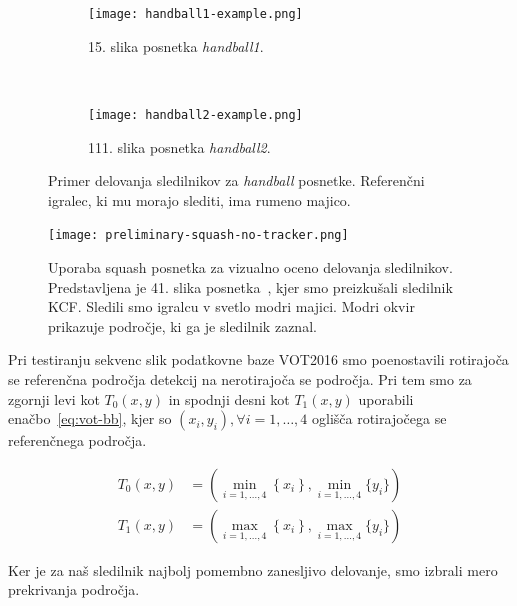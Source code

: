 \begin{figure}[!htbp]
	\centering
	
	\begin{subfigure}[t]{0.45\columnwidth}
		\texttt{[image: handball1-example.png]}
		\caption{15. slika posnetka \textit{handball1}.}
		\label{fig:testiranje-handball1}
	\end{subfigure}
	~
	\begin{subfigure}[t]{0.45\columnwidth}
		\texttt{[image: handball2-example.png]}
		\caption{111. slika posnetka \textit{handball2}.}
		\label{fig:testiranje-handball2}
	\end{subfigure}  
	\caption[Primer delovanja sledilnikov za \textit{handball} posnetke]{Primer delovanja sledilnikov za \textit{handball} posnetke. Referenčni igralec, ki mu morajo slediti, ima rumeno majico. }
	\label{fig:testiranje-tracker-visual}
\end{figure}



\begin{figure}[htbp]
	\centering
	\texttt{[image: preliminary-squash-no-tracker.png]}
	\caption[Uporaba squash posnetka za vizualno oceno delovanja sledilnikov]{Uporaba squash posnetka za vizualno oceno delovanja sledilnikov. Predstavljena je 41. slika posnetka~\cite{squashtv2014squash}, kjer smo preizkušali sledilnik KCF. Sledili smo igralcu v svetlo modri majici. Modri okvir prikazuje področje, ki ga je sledilnik zaznal.}
	\label{fig:testiranje-squash-1-kcf}
\end{figure}



Pri testiranju sekvenc slik podatkovne baze VOT2016 smo poenostavili rotirajoča se referenčna področja detekcij na nerotirajoča se področja. Pri tem smo za zgornji levi kot $T_0(x,y)$ in spodnji desni kot $T_1(x,y)$ uporabili enačbo~\eqref{eq:vot-bb}, kjer so $\left( x_i, y_i\right), \forall i=1,\ldots,4$ oglišča rotirajočega se referenčnega področja. 

\begin{equation}
\begin{aligned}
T_0(x,y) &= \left( \min_{i = 1,\ldots,4}\left\{x_i \right\}, 
\min_{i=1,\ldots,4}\{y_i \} \right) \\
T_1(x,y) &= \left( \max_{i = 1,\ldots,4}\left\{x_i \right\}, 
\max_{i=1,\ldots,4}\{y_i \} \right)
\end{aligned}
\label{eq:vot-bb}
\end{equation}

Ker je za naš sledilnik najbolj pomembno zanesljivo delovanje, smo izbrali mero prekrivanja področja.


